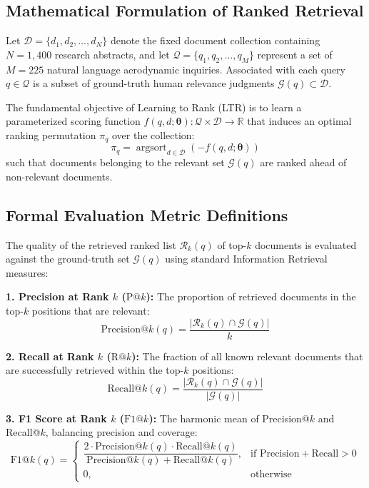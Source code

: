 \documentclass[11pt,a4paper]{article}
\begin{document}
\subsection{Mathematical Formulation of Ranked Retrieval}
Let $\mathcal{D} = \{d_1, d_2, \dots, d_N\}$ denote the fixed document collection containing $N = 1,400$ research abstracts, and let $\mathcal{Q} = \{q_1, q_2, \dots, q_M\}$ represent a set of $M = 225$ natural language aerodynamic inquiries. Associated with each query $q \in \mathcal{Q}$ is a subset of ground-truth human relevance judgments $\mathcal{G}(q) \subset \mathcal{D}$.

The fundamental objective of Learning to Rank (LTR) is to learn a parameterized scoring function $f(q, d; \boldsymbol{\theta}): \mathcal{Q} \times \mathcal{D} \to \mathbb{R}$ that induces an optimal ranking permutation $\pi_q$ over the collection:
\begin{equation}
\pi_q = \operatorname{argsort}_{d \in \mathcal{D}} \left( -f(q, d; \boldsymbol{\theta}) \right)
\label{eq:ranking_perm}
\end{equation}
such that documents belonging to the relevant set $\mathcal{G}(q)$ are ranked ahead of non-relevant documents.

\subsection{Formal Evaluation Metric Definitions}
The quality of the retrieved ranked list $\mathcal{R}_k(q)$ of top-$k$ documents is evaluated against the ground-truth set $\mathcal{G}(q)$ using standard Information Retrieval measures:

\textbf{1. Precision at Rank $k$ ($\text{P}@k$):} The proportion of retrieved documents in the top-$k$ positions that are relevant:
\begin{equation}
\text{Precision}@k(q) = \frac{|\mathcal{R}_k(q) \cap \mathcal{G}(q)|}{k}
\label{eq:precision}
\end{equation}

\textbf{2. Recall at Rank $k$ ($\text{R}@k$):} The fraction of all known relevant documents that are successfully retrieved within the top-$k$ positions:
\begin{equation}
\text{Recall}@k(q) = \frac{|\mathcal{R}_k(q) \cap \mathcal{G}(q)|}{|\mathcal{G}(q)|}
\label{eq:recall}
\end{equation}

\textbf{3. F1 Score at Rank $k$ ($\text{F1}@k$):} The harmonic mean of Precision@$k$ and Recall@$k$, balancing precision and coverage:
\begin{equation}
\text{F1}@k(q) = 
\begin{cases} 
\dfrac{2 \cdot \text{Precision}@k(q) \cdot \text{Recall}@k(q)}{\text{Precision}@k(q) + \text{Recall}@k(q)}, & \text{if } \text{Precision} + \text{Recall} > 0 \\ 
0, & \text{otherwise} 
\end{cases}
\label{eq:f1}
\end{equation}
\end{document}
